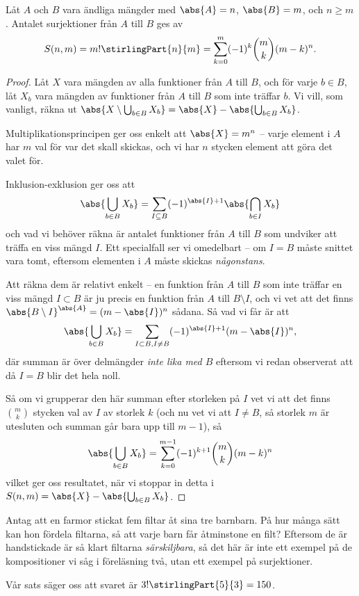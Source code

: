 \documentclass[nobib]{tufte-handout}
\begin{document}
\begin{theorem}\label{theorem_count_surjections}
  Låt $A$ och $B$ vara ändliga mängder med $\abs{A} = n$, $\abs{B} = m$, och $n \geq m$. Antalet surjektioner från $A$ till $B$ ges av
  $$S(n,m) = m!\stirlingPart{n}{m} = \sum_{k=0}^{m} (-1)^k \binom{m}{k}(m-k)^n.$$

  \begin{proof}
    Låt $X$ vara mängden av alla funktioner från $A$ till $B$, och för varje $b \in B$, låt $X_b$ vara mängden av funktioner från $A$ till $B$ som inte träffar $b$. Vi vill, som vanligt, räkna ut $\abs{X \setminus \bigcup_{b\in B} X_b} = \abs{X} - \abs{\bigcup_{b\in B} X_b}$.

    Multiplikationsprincipen ger oss enkelt att $\abs{X} = m^n$ -- varje element i $A$ har $m$ val för var det skall skickas, och vi har $n$ stycken element att göra det valet för.

    Inklusion-exklusion ger oss att
    $$\abs{\bigcup_{b\in B} X_b} = \sum_{I \subseteq B} (-1)^{\abs{I} + 1}\abs{\bigcap_{b \in I} X_b}$$
    och vad vi behöver räkna är antalet funktioner från $A$ till $B$ som undviker att träffa en viss mängd $I$. Ett specialfall ser vi omedelbart -- om $I = B$ måste snittet vara tomt, eftersom elementen i $A$ måste skickas \emph{någonstans}.

    Att räkna dem är relativt enkelt -- en funktion från $A$ till $B$ som inte träffar en viss mängd $I \subset B$ är ju precis en funktion från $A$ till $B \setminus I$, och vi vet att det finns $\abs{B \setminus I}^{\abs{A}} = (m - \abs{I})^n$ sådana. Så vad vi får är att
    $$\abs{\bigcup_{b\in B} X_b} = \sum_{I \subset B, I \neq B} (-1)^{\abs{I} + 1}(m - \abs{I})^n,$$
    där summan är över delmängder \emph{inte lika med $B$} eftersom vi redan observerat att då $I = B$ blir det hela noll.

    Så om vi grupperar den här summan efter storleken på $I$ vet vi att det finns $\binom{m}{k}$ stycken val av $I$ av storlek $k$ (och nu vet vi att $I \neq B$, så storlek $m$ är utesluten och summan går bara upp till $m-1$), så 
    $$\abs{\bigcup_{b\in B} X_b} = \sum_{k=0}^{m-1} (-1)^{k + 1}\binom{m}{k}(m - k)^n$$
    vilket ger oss resultatet, när vi stoppar in detta i $S(n,m) = \abs{X} - \abs{\bigcup_{b\in B} X_b}$.
  \end{proof}
\end{theorem}

\begin{example}
  Antag att en farmor stickat fem filtar åt sina tre barnbarn. På hur många sätt kan hon fördela filtarna, så att varje barn får åtminstone en filt? Eftersom de är handstickade är så klart filtarna \emph{särskiljbara}, så det här är inte ett exempel på de kompositioner vi såg i föreläsning två, utan ett exempel på surjektioner.

  Vår sats säger oss att svaret är $3!\stirlingPart{5}{3} = 150$.
\end{example}
\end{document}
